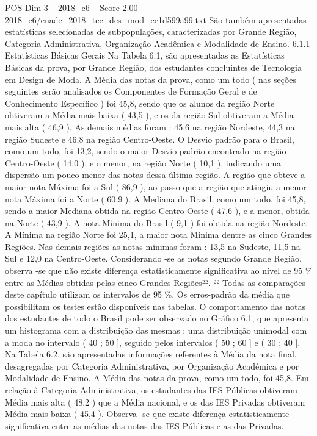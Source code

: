 \begin{textsample}{POS Dim 3 – 2018\_c6 – Score 2.00 – 2018\_c6/enade\_2018\_tec\_des\_mod\_ce1d599a99.txt}
São também apresentadas estatísticas selecionadas de subpopulações, caracterizadas por Grande Região, Categoria Administrativa, Organização Acadêmica e Modalidade de Ensino. 6.1.1 Estatísticas Básicas Gerais Na Tabela 6.1, são apresentadas as Estatísticas Básicas da prova, por Grande Região, dos estudantes concluintes de Tecnologia em Design de Moda.
A Média das notas da prova, como um todo ( nas seções seguintes serão analisados os Componentes de Formação Geral e de Conhecimento Específico ) foi 45,8, sendo que os alunos da região Norte obtiveram a Média mais baixa ( 43,5 ), e os da região Sul obtiveram a Média mais alta ( 46,9 ).
As demais médias foram : 45,6 na região Nordeste, 44,3 na região Sudeste e 46,8 na região Centro-Oeste.
O Desvio padrão para o Brasil, como um todo, foi 13,2, sendo o maior Desvio padrão encontrado na região Centro-Oeste ( 14,0 ), e o menor, na região Norte ( 10,1 ), indicando uma dispersão um pouco menor das notas dessa última região.
A região que obteve a maior nota Máxima foi a Sul ( 86,9 ), ao passo que a região que atingiu a menor nota Máxima foi a Norte ( 60,9 ).
A Mediana do Brasil, como um todo, foi 45,8, sendo a maior Mediana obtida na região Centro-Oeste ( 47,6 ), e a menor, obtida na Norte ( 43,9 ).
A nota Mínima do Brasil ( 9,1 ) foi obtida na região Nordeste.
A Mínima na região Norte foi 25,1, a maior nota Mínima dentre as cinco Grandes Regiões.
Nas demais regiões as notas mínimas foram : 13,5 na Sudeste, 11,5 na Sul e 12,0 na Centro-Oeste.
Considerando -se as notas segundo Grande Região, observa -se que não existe diferença estatisticamente significativa ao nível de 95 \% entre as Médias obtidas pelas cinco Grandes Regiões²². ²² Todas as comparações deste capítulo utilizam os intervalos de 95 \%.
Os erros-padrão da média que possibilitam os testes estão disponíveis nas tabelas.
O comportamento das notas dos estudantes de todo o Brasil pode ser observado no Gráfico 6.1, que apresenta um histograma com a distribuição das mesmas : uma distribuição unimodal com a moda no intervalo ( 40 ; 50 ], seguido pelos intervalos ( 50 ; 60 ] e ( 30 ; 40 ].
Na Tabela 6.2, são apresentadas informações referentes à Média da nota final, desagregadas por Categoria Administrativa, por Organização Acadêmica e por Modalidade de Ensino.
A Média das notas da prova, como um todo, foi 45,8.
Em relação à Categoria Administrativa, os estudantes das IES Públicas obtiveram Média mais alta ( 48,2 ) que a Média nacional, e os das IES Privadas obtiveram Média mais baixa ( 45,4 ).
Observa -se que existe diferença estatisticamente significativa entre as médias das notas das IES Públicas e as das Privadas.

\end{textsample}
